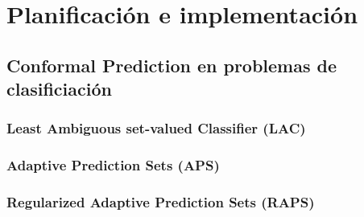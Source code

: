 \chapter{Planificación e implementación}


\section{}


\section{Conformal Prediction en problemas de clasificiación}

%


\subsection{Least Ambiguous set-valued Classifier (LAC)}

%


\subsection{Adaptive Prediction Sets (APS)}

%


\subsection{Regularized Adaptive Prediction Sets (RAPS)}

%


\subsection{}

